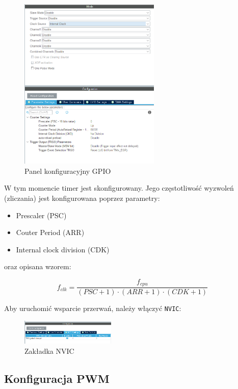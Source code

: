 \documentclass[11pt, a4paper]{article}
\begin{document}
\begin{figure}[h!]
    \centering
    \includegraphics[width=0.6\textwidth]{IMAGES/tim_timer.png}
    \caption{Panel konfiguracyjny GPIO}
\end{figure}

W tym momencie timer jest skonfigurowany. Jego częstotliwość wyzwoleń (zliczania) jest konfigurowana poprzez
parametry:

\begin{itemize}
    \item Prescaler (PSC)
    \item Couter Period (ARR)
    \item Internal clock division (CDK)
\end{itemize}

oraz opisana wzorem:

\[
f_{clk} = \frac{f_{cpu}}{(PSC+1)\cdot(ARR+1)\cdot(CDK+1)}
\]

\vspace{0.5cm}
Aby uruchomić wsparcie przerwań, należy włączyć \texttt{NVIC}:
\begin{figure}[h!]
    \centering
    \includegraphics[width=0.4\textwidth]{IMAGES/tim_nvic.png}
    \caption{Zakładka NVIC}
\end{figure}


\newpage

\subsection*{Konfiguracja PWM}
\end{document}
